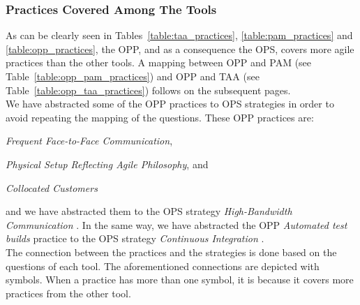 \subsubsection[Tool Practices]{Practices Covered Among The Tools}
\label{subsubsec:practices_among_tools}

As can be clearly seen in Tables~\ref{table:taa_practices}, \ref{table:pam_practices} and \ref{table:opp_practices}, the \ac{OPP}, and as a consequence the \ac{OPS}, covers more agile practices than the other tools. A mapping between \ac{OPP} and \ac{PAM} (see Table~\ref{table:opp_pam_practices}) and \ac{OPP} and \ac{TAA} (see Table~\ref{table:opp_taa_practices}) follows on the subsequent pages. \\

We have abstracted some of the \ac{OPP} practices to \ac{OPS} strategies in order to avoid repeating the mapping of the questions. These \ac{OPP} practices are: 
\begin{inparaenum} [a\upshape)]
	\item \textit{Frequent Face-to-Face Communication},
	\item \textit{Physical Setup Reflecting Agile Philosophy}, and
	\item \textit{Collocated Customers}
\end{inparaenum} and we have abstracted them to the \ac{OPS} strategy \textit{High-Bandwidth Communication}  \cite[p. 57]{sventha_dissertation}. In the same way, we have abstracted the \ac{OPP} \textit{Automated test builds} practice to the \ac{OPS} strategy \textit{Continuous Integration} \cite[p. 57]{sventha_dissertation}. \\

The connection between the practices and the strategies is done based on the questions of each tool. The aforementioned connections are depicted with symbols. When a practice has more than one symbol, it is because it covers more practices from the other tool. \\

